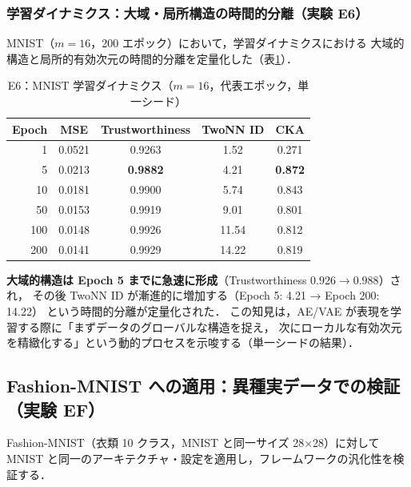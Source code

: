 \documentclass[11pt,a4paper]{jsarticle}
\begin{document}
\subsubsection{学習ダイナミクス：大域・局所構造の時間的分離（実験 E6）}

MNIST（$m = 16$，200 エポック）において，学習ダイナミクスにおける
大域的構造と局所的有効次元の時間的分離を定量化した（表\ref{tab:e6}）．

\begin{table}[H]
\centering
\caption{E6：MNIST 学習ダイナミクス（$m=16$，代表エポック，単一シード）}
\label{tab:e6}
\small
\begin{tabular}{rcccc}
\toprule
Epoch & MSE & Trustworthiness & TwoNN ID & CKA \\
\midrule
1   & 0.0521 & 0.9263 & 1.52 & 0.271 \\
5   & 0.0213 & \textbf{0.9882} & 4.21 & \textbf{0.872} \\
10  & 0.0181 & 0.9900 & 5.74 & 0.843 \\
50  & 0.0153 & 0.9919 & 9.01 & 0.801 \\
100 & 0.0148 & 0.9926 & 11.54 & 0.812 \\
200 & 0.0141 & 0.9929 & 14.22 & 0.819 \\
\bottomrule
\end{tabular}
\end{table}

\textbf{大域的構造は Epoch 5 までに急速に形成}（Trustworthiness $0.926 \to 0.988$）され，
その後 TwoNN ID が漸進的に増加する（Epoch 5: 4.21 → Epoch 200: 14.22）
という時間的分離が定量化された．
この知見は，AE/VAE が表現を学習する際に「まずデータのグローバルな構造を捉え，
次にローカルな有効次元を精緻化する」という動的プロセスを示唆する（単一シードの結果）．

\subsection{Fashion-MNIST への適用：異種実データでの検証（実験 EF）}\label{sec:exp_fashion}

Fashion-MNIST（衣類 10 クラス，MNIST と同一サイズ 28×28）に対して
MNIST と同一のアーキテクチャ・設定を適用し，フレームワークの汎化性を検証する．
\end{document}
